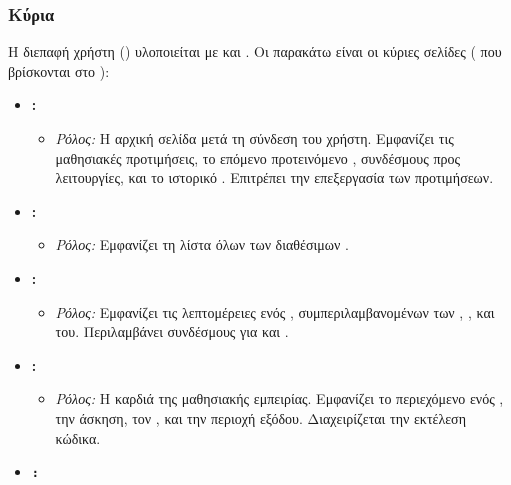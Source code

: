 \subsubsection{ Κύρια }
\label{sec:frontend_components_detailed}
Η διεπαφή χρήστη () υλοποιείται με  και . Οι παρακάτω είναι οι κύριες σελίδες ( που βρίσκονται στο \texttt{}):
\begin{itemize}[leftmargin=*, noitemsep]
    \item \textbf{\texttt{}:}
        \begin{itemize}[leftmargin=+, noitemsep]
            \item \textit{Ρόλος:} Η αρχική σελίδα μετά τη σύνδεση του χρήστη. Εμφανίζει τις μαθησιακές προτιμήσεις, το επόμενο προτεινόμενο , συνδέσμους προς λειτουργίες, και το ιστορικό . Επιτρέπει την επεξεργασία των προτιμήσεων.
        \end{itemize}
    \item \textbf{\texttt{}:}
        \begin{itemize}[leftmargin=+, noitemsep]
            \item \textit{Ρόλος:} Εμφανίζει τη λίστα όλων των διαθέσιμων .
        \end{itemize}
    \item \textbf{\texttt{}:}
        \begin{itemize}[leftmargin=+, noitemsep]
            \item \textit{Ρόλος:} Εμφανίζει τις λεπτομέρειες ενός , συμπεριλαμβανομένων των , , και  του. Περιλαμβάνει συνδέσμους για  και .
        \end{itemize}
    \item \textbf{\texttt{}:}
        \begin{itemize}[leftmargin=+, noitemsep]
            \item \textit{Ρόλος:} Η καρδιά της μαθησιακής εμπειρίας. Εμφανίζει το περιεχόμενο ενός , την άσκηση, τον , και την περιοχή εξόδου. Διαχειρίζεται την  εκτέλεση κώδικα.
        \end{itemize}
    \item \textbf{\texttt{:}}

\end{itemize}
